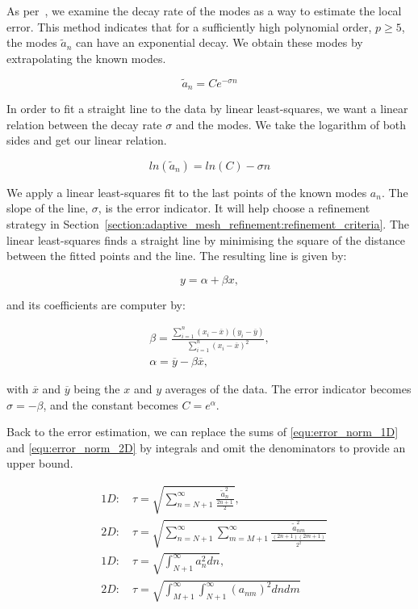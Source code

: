 As per~\cite{Mavriplis1990}, we examine the decay rate of the modes as a way to estimate the local
error. This method indicates that for a sufficiently high polynomial order, $p \geq 5$, the modes
$\widetilde{a}_n$ can have an exponential decay. We obtain these modes by extrapolating the known
modes. 

\begin{equation} \label{equ:exponential_decay}
	\widetilde{a}_n = Ce^{-\sigma n}
\end{equation}

In order to fit a straight line to the data by linear least-squares, we want a linear relation
between the decay rate $\sigma$ and the modes. We take the logarithm of both sides and get our
linear relation.

\begin{equation} \label{equ:exponential_decay_linear}
	ln(\widetilde{a}_n) = ln(C) - \sigma n
\end{equation}

We apply a linear least-squares fit to the last points of the known modes $a_n$. The slope of the
line, $\sigma$, is the error indicator. It will help choose a refinement strategy in
Section~\ref{section:adaptive_mesh_refinement:refinement_criteria}. The linear least-squares finds a
straight line by minimising the square of the distance between the fitted points and the line. The
resulting line is given by:

\begin{equation}
	y = \alpha + \beta x,
\end{equation}

and its coefficients are computer by:

\begin{gather}
	\beta = \frac{\sum_{i = 1}^{n}(x_i - \overline{x})(y_i - \overline{y})}{\sum_{i = 1}^{n}(x_i -\overline{x})^2}, \\
	\alpha = \overline{y} - \beta \overline{x},
\end{gather}

with $\overline{x}$ and $\overline{y}$ being the $x$ and $y$ averages of the data. The error
indicator becomes $\sigma = - \beta$, and the constant becomes $C = e^\alpha$.

Back to the error estimation, we can replace the sums of \ref{equ:error_norm_1D} and
\ref{equ:error_norm_2D} by integrals and omit the denominators to provide an upper bound.

\begin{align}
	&1D: \quad \tau = \sqrt{\sum_{n = N + 1}^{\infty } \frac{\widetilde{a}_n^2}{\frac{2n + 1}{2}}}, \label{equ:error_1D_sums}
	\\
	&2D: \quad \tau = \sqrt{\sum_{n = N + 1}^{\infty }\sum_{m = M + 1}^{\infty}\frac{\widetilde{a}^2_{nm}}{\frac{(2n + 1)(2m + 1)}{2^2}}} \label{equ:error_2D_sums}
	\\
	&1D: \quad \tau = \sqrt{\int_{N + 1}^{\infty } a_n^2 dn}, \label{equ:error_1D_integrals}
	\\
	&2D: \quad \tau = \sqrt{\int_{M+1}^{\infty }\int_{N + 1 }^{\infty}(a_{nm})^2 dn dm} \label{equ:error_2D_integrals}
\end{align}

